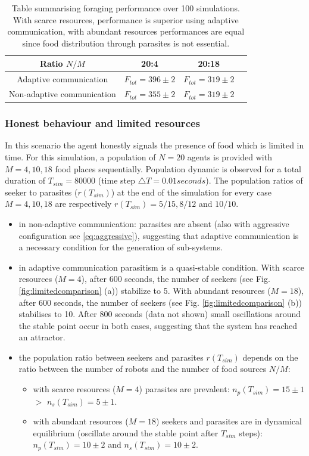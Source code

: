 \begin{table}[htbp]
\caption[Foraging performance with unlimited resources]{
Table summarising foraging performance over 100 simulations.
With scarce resources, performance is superior using adaptive communication,
with abundant resources performances are equal since food distribution
through parasites is not essential.\label{tab:performance}}
{
\begin{tabular}{@{}cccc@{}}
\hline
Ratio $N/M$ & 20:4 & 20:18\\
\hline
Adaptive communication & $F_{tot}=396\pm2$ & $F_{tot}=319\pm2$\\
\hline
Non-adaptive communication & $F_{tot}=355\pm2$ & $F_{tot}=319\pm2$\\
\hline
\end{tabular}}
\end{table}

\subsubsection{Honest behaviour and limited resources}
In this scenario the agent honestly signals the presence of food which is limited in time.
For this simulation, a population of $N=20$ agents is provided with $M=4,10,18$
food places sequentially. Population dynamic is observed for a total duration
of  $T_{sim}=80000$ (time step $\triangle T=0.01 seconds$).
The population ratios of seeker to parasites ($r(T_{sim})$) at the end of
the simulation for every case $M=4,10,18$ are respectively $r(T_{sim})=5/15,8/12$
and $10/10$.
\begin{itemize}
\item in non-adaptive communication: parasites are absent (also with aggressive
configuration see \ref{eq:aggressive}), suggesting that adaptive communication
is a necessary condition for the generation of sub-systems.
\item in adaptive communication parasitism is a quasi-stable condition.
With scarce resources ($M=4$), after 600 seconds, the number of seekers
(see Fig. \ref{fig:limitedcomparison} (a)) stabilize to 5. With abundant resources ($M=18$),
after 600 seconds, the number of seekers (see Fig. \ref{fig:limitedcomparison} (b))
stabilises to 10. After 800 seconds (data not shown) small oscillations around
the stable point occur in both cases, suggesting that the system has reached an attractor.
\item the population ratio between seekers and parasites $r(T_{sim})$ depends
on the ratio between the number of robots and the number of food sources $N/M$:
\begin{itemize}
\item with scarce resources ($M=4$) parasites are prevalent:
$n_{p}(T_{sim})=15\pm1$ $>$ $n_{s}(T_{sim})=5\pm1$.
\item with abundant resources ($M=18$) seekers and parasites are in dynamical
equilibrium (oscillate around the stable point after $T_{sim}$ steps):
$n_{p}(T_{sim})=10\pm2$ and $n_{s}(T_{sim})=10\pm2$.
\end{itemize}
\end{itemize}

